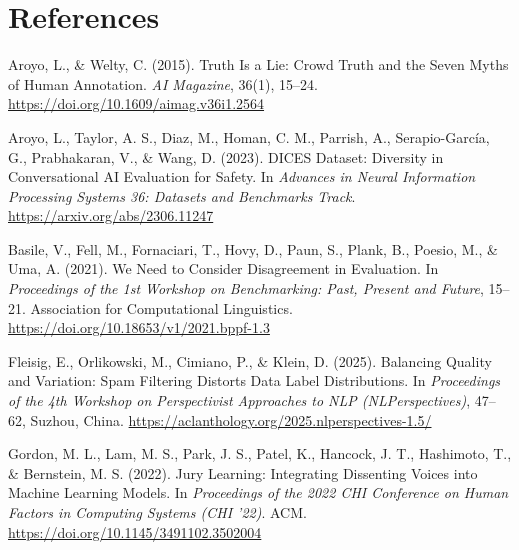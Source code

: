 \documentclass[11pt,a4paper]{article}
\begin{document}
%
\section*{References}

\begin{description}[leftmargin=1.6em,style=unboxed,itemsep=0.3em]

\item Aroyo, L., \& Welty, C. (2015). Truth Is a Lie: Crowd Truth and the Seven Myths of Human
Annotation. \emph{AI Magazine}, 36(1), 15--24.
\url{https://doi.org/10.1609/aimag.v36i1.2564}

\item Aroyo, L., Taylor, A. S., Diaz, M., Homan, C. M., Parrish, A., Serapio-Garc\'{i}a, G.,
Prabhakaran, V., \& Wang, D. (2023). DICES Dataset: Diversity in Conversational AI Evaluation for
Safety. In \emph{Advances in Neural Information Processing Systems 36: Datasets and Benchmarks
Track}. \url{https://arxiv.org/abs/2306.11247}

\item Basile, V., Fell, M., Fornaciari, T., Hovy, D., Paun, S., Plank, B., Poesio, M., \& Uma, A.
(2021). We Need to Consider Disagreement in Evaluation. In \emph{Proceedings of the 1st Workshop
on Benchmarking: Past, Present and Future}, 15--21. Association for Computational Linguistics.
\url{https://doi.org/10.18653/v1/2021.bppf-1.3}

\item Fleisig, E., Orlikowski, M., Cimiano, P., \& Klein, D. (2025). Balancing Quality and
Variation: Spam Filtering Distorts Data Label Distributions. In \emph{Proceedings of the 4th
Workshop on Perspectivist Approaches to NLP (NLPerspectives)}, 47--62, Suzhou, China.
\url{https://aclanthology.org/2025.nlperspectives-1.5/}

\item Gordon, M. L., Lam, M. S., Park, J. S., Patel, K., Hancock, J. T., Hashimoto, T., \&
Bernstein, M. S. (2022). Jury Learning: Integrating Dissenting Voices into Machine Learning
Models. In \emph{Proceedings of the 2022 CHI Conference on Human Factors in Computing Systems
(CHI '22)}. ACM. \url{https://doi.org/10.1145/3491102.3502004}


\end{description}
\end{document}
